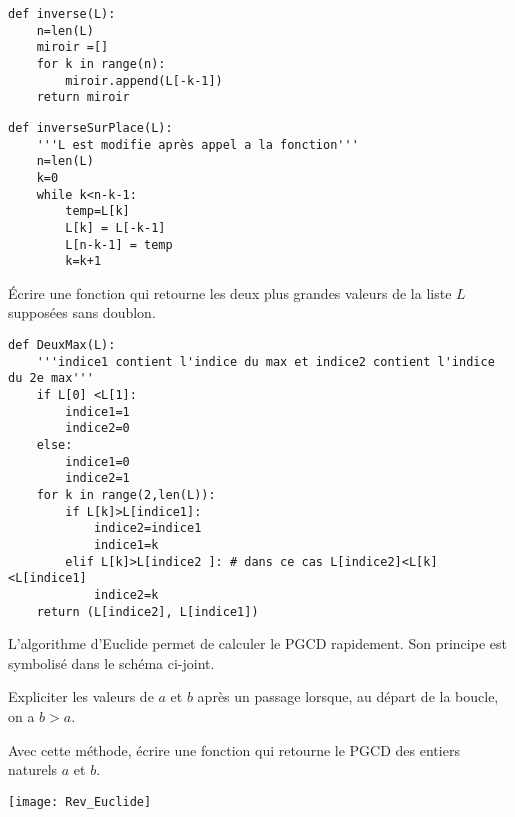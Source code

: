 \begin{Answer}
\begin{lstlisting}
def inverse(L):
    n=len(L)
    miroir =[]
    for k in range(n):
        miroir.append(L[-k-1])
    return miroir
\end{lstlisting}

\newpage

\begin{lstlisting}
def inverseSurPlace(L):
    '''L est modifie après appel a la fonction'''
    n=len(L)
    k=0
    while k<n-k-1:
        temp=L[k]
        L[k] = L[-k-1]
        L[n-k-1] = temp
        k=k+1
\end{lstlisting}
\end{Answer}
\begin{Exercise}
Écrire une fonction  qui retourne les deux plus grandes valeurs de la liste $L$ supposées sans doublon.
\end{Exercise}
\begin{Answer}
\begin{lstlisting}
def DeuxMax(L):
    '''indice1 contient l'indice du max et indice2 contient l'indice du 2e max'''
    if L[0] <L[1]:
        indice1=1
        indice2=0
    else:
        indice1=0
        indice2=1
    for k in range(2,len(L)):
        if L[k]>L[indice1]:
            indice2=indice1
            indice1=k  
        elif L[k]>L[indice2 ]: # dans ce cas L[indice2]<L[k]<L[indice1]
            indice2=k
    return (L[indice2], L[indice1])
\end{lstlisting}
\end{Answer}
\newpage
\begin{Exercise}
\begin{minipage}{0.45\textwidth}
\vspace{0pt}
L'algorithme d'Euclide permet de calculer le PGCD rapidement. Son principe est symbolisé dans le schéma ci-joint.

Expliciter les valeurs de $a$ et $b$ après un passage lorsque, au départ de la boucle, on a $b>a$.

Avec cette méthode, écrire une fonction  qui retourne le PGCD des entiers naturels $a$ et $b$.
\end{minipage}
\hskip 8mm
\begin{minipage}{0.50\textwidth}
\vspace{0pt}
\texttt{[image: Rev\_Euclide]}
\end{minipage}
\end{Exercise}
